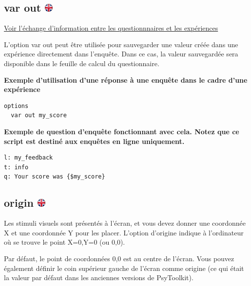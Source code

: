 \documentclass[
]{book}
\begin{document}
\hypertarget{var-out}{%
\subsection[var out ]{\texorpdfstring{var out
\href{https://www.psytoolkit.org/doc3.2.0/syntax.html\#_var_out}{\protect\includegraphics{img/ukflag.png}}}{var out }}\label{var-out}}

\protect\hyperlink{s11}{Voir l'échange d'information entre les
questionnnaires et les expériences}

L'option var out peut être utilisée pour sauvegarder une valeur créée
dans une expérience directement dans l'enquête. Dans ce cas, la valeur
sauvegardée sera disponible dans le feuille de calcul du questionnaire.

\textbf{Exemple d'utilisation d'une réponse à une enquête dans le cadre
d'une expérience}

\begin{verbatim}
options
  var out my_score
\end{verbatim}

\textbf{Exemple de question d'enquête fonctionnant avec cela. Notez que
ce script est destiné aux enquêtes en ligne uniquement.}

\begin{verbatim}
l: my_feedback
t: info
q: Your score was {$my_score}
\end{verbatim}

\hypertarget{origin}{%
\subsection[origin ]{\texorpdfstring{origin
\href{https://www.psytoolkit.org/doc3.2.0/syntax.html\#options-origin}{\protect\includegraphics{img/ukflag.png}}}{origin }}\label{origin}}

Les stimuli visuels sont présentés à l'écran, et vous devez donner une
coordonnée X et une coordonnée Y pour les placer. L'option d'origine
indique à l'ordinateur où se trouve le point X=0,Y=0 (ou 0,0).

Par défaut, le point de coordonnées 0,0 est au centre de l'écran. Vous
pouvez également définir le coin supérieur gauche de l'écran comme
origine (ce qui était la valeur par défaut dans les anciennes versions
de PsyToolkit).
\end{document}
